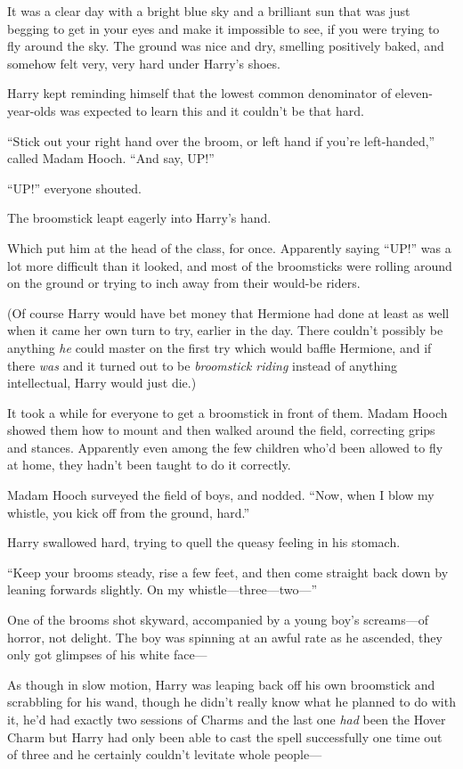 It was a clear day with a bright blue sky and a brilliant sun that was just begging to get in your eyes and make it impossible to see, if you were trying to fly around the sky. The ground was nice and dry, smelling positively baked, and somehow felt very, very hard under Harry’s shoes.

Harry kept reminding himself that the lowest common denominator of eleven-year-olds was expected to learn this and it couldn’t be that hard.

“Stick out your right hand over the broom, or left hand if you’re left-handed,” called Madam Hooch. “And say, UP!”

“UP!” everyone shouted.

The broomstick leapt eagerly into Harry’s hand.

Which put him at the head of the class, for once. Apparently saying “UP!” was a lot more difficult than it looked, and most of the broomsticks were rolling around on the ground or trying to inch away from their would-be riders.

(Of course Harry would have bet money that Hermione had done at least as well when it came her own turn to try, earlier in the day. There couldn’t possibly be anything \emph{he} could master on the first try which would baffle Hermione, and if there \emph{was} and it turned out to be \emph{broomstick riding} instead of anything intellectual, Harry would just die.)

It took a while for everyone to get a broomstick in front of them. Madam Hooch showed them how to mount and then walked around the field, correcting grips and stances. Apparently even among the few children who’d been allowed to fly at home, they hadn’t been taught to do it correctly.

Madam Hooch surveyed the field of boys, and nodded. “Now, when I blow my whistle, you kick off from the ground, hard.”

Harry swallowed hard, trying to quell the queasy feeling in his stomach.

“Keep your brooms steady, rise a few feet, and then come straight back down by leaning forwards slightly. On my whistle—three—two—”

One of the brooms shot skyward, accompanied by a young boy’s screams—of horror, not delight. The boy was spinning at an awful rate as he ascended, they only got glimpses of his white face—

As though in slow motion, Harry was leaping back off his own broomstick and scrabbling for his wand, though he didn’t really know what he planned to do with it, he’d had exactly two sessions of Charms and the last one \emph{had} been the Hover Charm but Harry had only been able to cast the spell successfully one time out of three and he certainly couldn’t levitate whole people—

